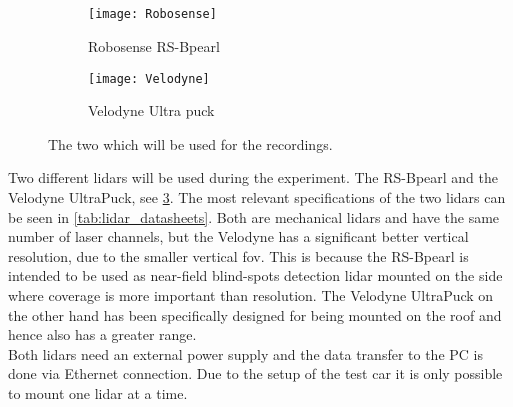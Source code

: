 \subsection{}
\begin{figure}[htbp]
    \centering
    \begin{subfigure}{0.4\textwidth}
        \centering
        \texttt{[image: Robosense]}
        \caption[The \glspl{lidar} used in the experiment]{Robosense RS-Bpearl \cite{RoboSense2020}}
        \label{fig:lidar_robosense}
    \end{subfigure}
    \begin{subfigure}{0.4\textwidth}
        \centering
        \texttt{[image: Velodyne]}
        \caption{Velodyne Ultra puck \cite{Velodyne2018}}
        \label{fig:lidar_velodyne}
    \end{subfigure}
    \caption{The two  which will be used for the recordings.}
    \label{fig:lidars_used}
\end{figure}
Two different \glspl{lidar} will be used during the experiment.
The RS-Bpearl and the Velodyne UltraPuck, see \cref{fig:lidars_used}.
The most relevant specifications of the two \glspl{lidar} can be seen in \cref{tab:lidar_datasheets}.
Both are mechanical \glspl{lidar} and have the same number of laser channels, but the Velodyne has a significant better vertical resolution, due to the smaller vertical \gls{fov}.
This is because the RS-Bpearl is intended to be used as near-field blind-spots detection \gls{lidar} mounted on the side where coverage is more important than resolution.
The Velodyne UltraPuck on the other hand has been specifically designed for being mounted on the roof and hence also has a greater range.\\
Both \glspl{lidar} need an external power supply and the data transfer to the PC is done via Ethernet connection.
Due to the setup of the test car it is only possible to mount one \gls{lidar} at a time.
